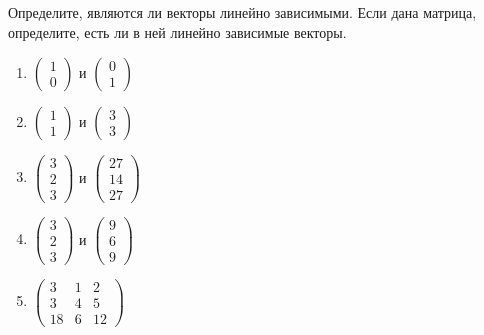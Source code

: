 \documentclass[11pt, a4paper]{extarticle}
\begin{document}
\subsection{}
Определите, являются ли векторы линейно зависимыми. Если дана матрица, определите, есть ли в ней линейно зависимые векторы.
\begin{multicols}{3}
	\begin{enumerate}[label=\alph*)]
		\item $\begin{pmatrix}
		1 \\ 0
		\end{pmatrix}$ и $\begin{pmatrix}
		0 \\ 1
		\end{pmatrix}$
		
		\item $\begin{pmatrix}
		1 \\ 1
		\end{pmatrix}$ и $\begin{pmatrix}
		3 \\ 3
		\end{pmatrix}$
		
		\item $\begin{pmatrix}
		3 \\ 2 \\ 3
		\end{pmatrix}$ и $\begin{pmatrix}
		27 \\ 14 \\ 27
		\end{pmatrix}$
		
		\item $\begin{pmatrix}
		3 \\ 2 \\ 3
		\end{pmatrix}$ и $\begin{pmatrix}
		9 \\ 6 \\ 9
		\end{pmatrix}$
		
		\item $\begin{pmatrix}
		3 & 1 & 2 \\
		3 & 4 & 5 \\
		18 & 6 & 12
		\end{pmatrix}$
		

\end{enumerate}
\end{multicols}
\end{document}
